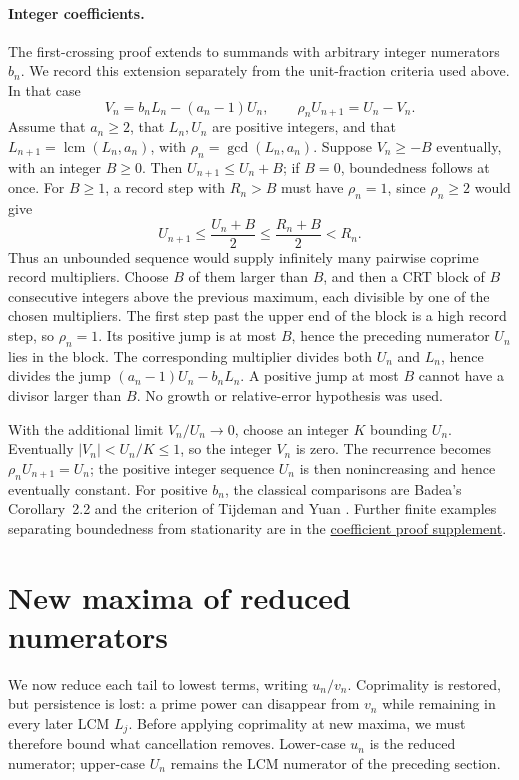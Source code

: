\paragraph{Integer coefficients.}
The first-crossing proof extends to summands with arbitrary integer
numerators $b_n$. We record this extension separately from the
unit-fraction criteria used above. In that case
\[
 V_n=b_nL_n-(a_n-1)U_n,\qquad
 \rho_nU_{n+1}=U_n-V_n.
\]
Assume that $a_n\ge2$, that $L_n,U_n$ are positive integers, and that
$L_{n+1}=\operatorname{lcm}(L_n,a_n)$, with
$\rho_n=\gcd(L_n,a_n)$. Suppose $V_n\ge-B$ eventually, with an integer
$B\ge0$. Then $U_{n+1}\le U_n+B$; if $B=0$, boundedness follows at once.
For $B\ge1$, a record step with $R_n>B$ must have $\rho_n=1$, since
$\rho_n\ge2$ would give
\[
 U_{n+1}\le\frac{U_n+B}{2}\le\frac{R_n+B}{2}<R_n.
\]
Thus an unbounded sequence would supply infinitely many pairwise coprime
record multipliers. Choose $B$ of them larger than $B$, and then a CRT
block of $B$ consecutive integers above the previous maximum, each
divisible by one of the chosen multipliers. The first step past the upper
end of the block is a high record step, so $\rho_n=1$.
Its positive jump is at most $B$, hence the preceding numerator $U_n$
lies in the block. The corresponding multiplier divides both $U_n$ and
$L_n$, hence divides the jump $(a_n-1)U_n-b_nL_n$. A positive jump at most $B$ cannot have a divisor
larger than $B$. No growth or relative-error hypothesis was used.

With the additional limit $V_n/U_n\to0$, choose an integer $K$ bounding
$U_n$. Eventually $|V_n|<U_n/K\le1$, so the integer $V_n$ is zero.
The recurrence becomes $\rho_nU_{n+1}=U_n$; the positive integer
sequence $U_n$ is then nonincreasing and hence eventually constant. For positive $b_n$, the classical comparisons
are Badea's Corollary~2.2 \cite[p.~316]{badea1993} and the criterion of
Tijdeman and Yuan \cite{tijdemanyuan2002}. Further finite examples
separating boundedness from stationarity are in the
\href{https://github.com/wcook04/plectis-erdos/blob/eccd8afc6db3c02a2265d0601b727d6c5e4467d5/lean/ErdosProblems/Erdos243/CoefficientUniformBoundedHeight.md}
{coefficient proof supplement}.

\section{New maxima of reduced numerators}\label{long243:sec:records}

We now reduce each tail to lowest terms, writing $u_n/v_n$.
Coprimality is restored, but persistence is lost: a prime power can
disappear from $v_n$ while remaining in every later LCM $L_j$.
Before applying coprimality at new maxima, we must therefore bound
what cancellation removes. Lower-case $u_n$ is the reduced numerator;
upper-case $U_n$ remains the LCM numerator of the preceding section.


